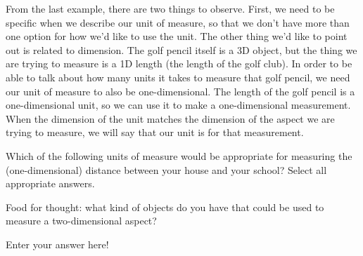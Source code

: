 \documentclass{ximera}
\begin{document}
From the last example, there are two things to observe. First, we need to be specific when we describe our unit of measure, so that we don't have more than one option for how we'd like to use the unit. The other thing we'd like to point out is related to dimension. The golf pencil itself is a 3D object, but the thing we are trying to measure is a 1D length (the length of the golf club). In order to be able to talk about how many units it takes to measure that golf pencil, we need our unit of measure to also be one-dimensional. The length of the golf pencil is a one-dimensional unit, so we can use it to make a one-dimensional measurement. When the dimension of the unit matches the dimension of the aspect we are trying to measure, we will say that our unit is  for that measurement.

\begin{question}
Which of the following units of measure would be appropriate for measuring the (one-dimensional) distance between your house and your school? Select all appropriate answers.
\begin{selectAll}
\end{selectAll}
\end{question}

\begin{question}
Food for thought: what kind of objects do you have that could be used to measure a two-dimensional aspect?
\begin{freeResponse}
Enter your answer here!
\end{freeResponse}
\end{question}
\end{document}
